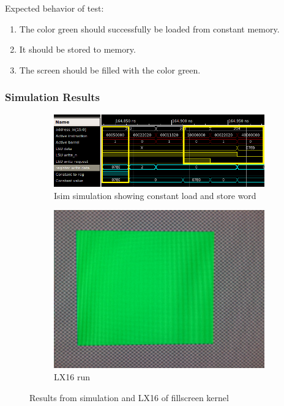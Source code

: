 \documentclass[../main/report.tex]{subfiles}
\begin{document}
Expected behavior of test:
\begin{enumerate}
  \item
    The color green should successfully be loaded from constant memory.
  \item
    It should be stored to memory.
  \item
    The screen should be filled with the color green.
\end{enumerate}

\subsubsection*{Simulation Results}

\begin{figure}[H]
  \centering
  \begin{subfigure}[b]{\textwidth}
    \includegraphics[width=\textwidth]{../testing/assets/Constant_load_&_store.png}
    \caption{Isim simulation showing constant load and store word}
    \label{fig:isim-kernel-parameterization}
  \end{subfigure}
  \begin{subfigure}[b]{0.3\textwidth}
    \includegraphics[width=\textwidth]{../testing/assets/green_screen.jpg}
    \caption{LX16 run}
    \label{fig:LX16-kernel-parameterization}
  \end{subfigure}
  \caption{Results from simulation and LX16 of fillscreen kernel}
\end{figure}
\end{document}
